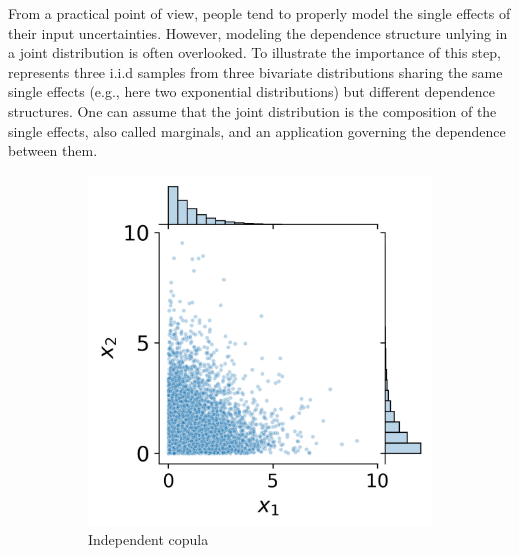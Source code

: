 From a practical point of view, people tend to properly model the single effects of their input uncertainties. 
However, modeling the dependence structure unlying in a joint distribution is often overlooked.  
To illustrate the importance of this step,  represents three i.i.d samples from three bivariate distributions sharing the same single effects (e.g., here two exponential distributions) but different dependence structures.
One can assume that the joint distribution is the composition of the single effects, also called marginals, and an application governing the dependence between them.
\begin{figure}[ht]
    \centering
    \begin{subfigure}[b]{0.32\textwidth}
        \centering
        \includegraphics[width=\textwidth]{../numerical_experiments/chapter1/figures/independent_copula.png}
        \caption{Independent copula}
    \end{subfigure}
    \hfill
    \begin{subfigure}[b]{0.32\textwidth}
        \centering

\end{subfigure}
\end{figure}
